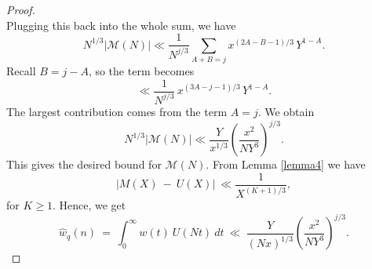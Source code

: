 \documentclass[10pt,a4paper]{amsart}
\begin{document}
\begin{proof}
\begin{equation*}
\end{equation*}
Plugging this back into the whole sum, we have
\begin{equation*}
    N^{1/3} |\mathcal{M}(N)| \ll \frac{1}{N^{j/3}} \sum_{A + B = j} x^{(2A - B - 1)/3}\, Y^{1 - A}.
\end{equation*}
Recall $B = j - A$, so the term becomes
\begin{equation*}
    \ll \frac{1}{N^{j/3}}\, x^{(3A - j - 1)/3}\, Y^{1 - A}.
\end{equation*}
The largest contribution comes from the term $A = j$. We obtain
\begin{equation*}
    N^{1/3} |\mathcal{M}(N)| \ll \frac{Y}{x^{1/3}} \left( \frac{x^2}{N Y^3} \right)^{j/3}.
\end{equation*}
This gives the desired bound for $\mathcal{M}(N)$. From Lemma \ref{lemma4} we have 
\begin{equation*}
    \left|M(X)\  -\  U(X)\right|\ \ll  \frac{1}{X^{(K+1)/3}},
\end{equation*}
for $K\geq 1$. Hence,  we get
\begin{equation*}
    \hat{w}_q(n)\ =\ \int_{0}^{\infty} w(t)\  U(Nt)\ dt\ \ll \  \frac{Y}{(Nx)^{1/3}} \left( \frac{x^2}{N Y^3} \right)^{j/3}.
\end{equation*}
\end{proof}
\end{document}
